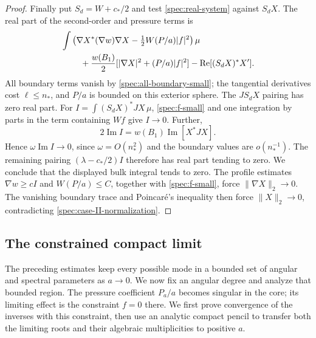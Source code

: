 \begin{proof}
Finally put $S_d=W+c_*/2$ and test \eqref{spec:real-system} against
$S_dX$. The real part of the second-order and pressure terms is
\begin{align*}
 &\int\left(\nabla X^*(\nabla w)\nabla X
       -\tfrac12W(P/a)|f|^2\right)\mu\\
 &\hspace{8mm}
 +\frac{w(B_1)}2[|\nabla X|^2+(P/a)|f|^2]
 -\operatorname{Re}[(S_dX)^*X'].
\end{align*}
All boundary terms vanish by \eqref{spec:all-boundary-small}; the
tangential derivatives cost $\ell\le n_*$, and $P/a$ is bounded on
this exterior sphere. The $JS_dX$ pairing has zero real part. For
$I=\int(S_dX)^*JX\,\mu$, \eqref{spec:f-small} and one integration
by parts in the term containing $Wf$ give $I\to0$. Further,
\[
 2\operatorname{Im}I=w(B_1)\operatorname{Im}[X^*JX].
\]
Hence $\omega\operatorname{Im}I\to0$, since
$\omega=O(n_*^2)$ and the boundary values are $o(n_*^{-1})$.
The remaining pairing $(\lambda-c_*/2)I$ therefore has real part
tending to zero. We conclude that the displayed bulk integral tends
to zero. The profile estimates $\nabla w\ge cI$ and $W(P/a)\le C$,
together with \eqref{spec:f-small}, force $\|\nabla X\|_2\to0$.
The vanishing boundary trace and Poincar\'e's inequality then force
$\|X\|_2\to0$, contradicting \eqref{spec:case-II-normalization}.
\end{proof}

\subsection{The constrained compact limit}

The preceding estimates keep every possible mode in a bounded set of
angular and spectral parameters as $a\to0$. We now fix an angular degree
and analyze that bounded region. The pressure coefficient $P_a/a$ becomes
singular in the core; its limiting effect is the constraint $f=0$ there.
We first prove convergence of the inverses with this constraint, then
use an analytic compact pencil to transfer both the limiting roots and
their algebraic multiplicities to positive $a$.

